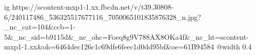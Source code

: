  
 
 
 
 

\ifcmt
  ig https://scontent-mxp1-1.xx.fbcdn.net/v/t39.30808-6/240117486_536325517677116_7050065101835876328_n.jpg?_nc_cat=104&ccb=1-5&_nc_sid=b9115d&_nc_ohc=Foeq8g9V788AX8OKa4f&_nc_ht=scontent-mxp1-1.xx&oh=6464dec126c1c69dfe6feec1d0dd95bf&oe=61B94584
  @width 0.4
\fi
